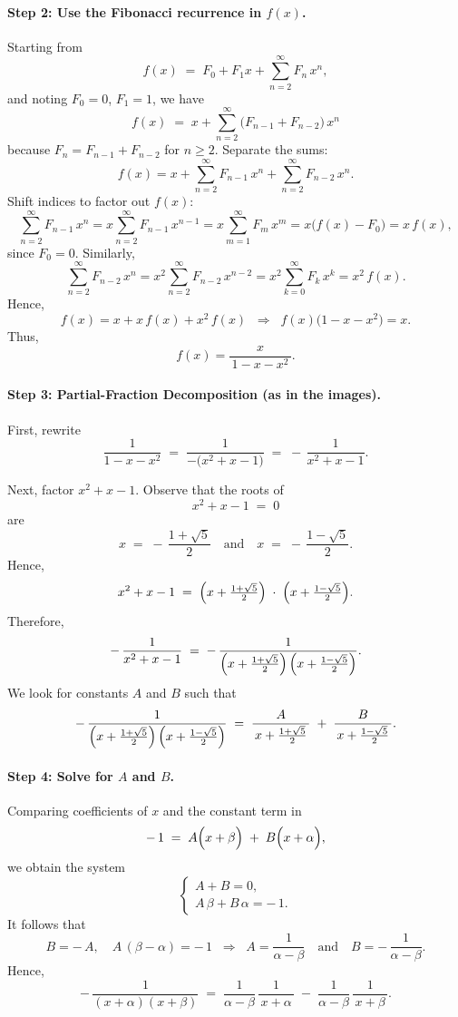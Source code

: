 \documentclass{article}
\begin{document}
\paragraph{Step 2: Use the Fibonacci recurrence in \(f(x)\).}
Starting from
\[
f(x) \;=\; F_0 + F_1 x + \sum_{n=2}^{\infty} F_n\,x^n,
\]
and noting \(F_0=0\), \(F_1=1\), we have
\[
f(x) \;=\; x + \sum_{n=2}^{\infty} \bigl(F_{n-1} + F_{n-2}\bigr)\,x^n
\]
because \(F_n = F_{n-1} + F_{n-2}\) for \(n\ge2\). Separate the sums:
\[
f(x)
= x
+ \sum_{n=2}^{\infty} F_{n-1}\,x^n
+ \sum_{n=2}^{\infty} F_{n-2}\,x^n.
\]
Shift indices to factor out \(f(x)\):
\[
\sum_{n=2}^{\infty} F_{n-1}\,x^n 
= x \sum_{n=2}^{\infty} F_{n-1}\,x^{n-1} 
= x \sum_{m=1}^{\infty} F_m\,x^m 
= x \bigl(f(x) - F_0\bigr) 
= x\,f(x),
\]
since \(F_0=0\). Similarly,
\[
\sum_{n=2}^{\infty} F_{n-2}\,x^n 
= x^2 \sum_{n=2}^{\infty} F_{n-2}\,x^{n-2}
= x^2 \sum_{k=0}^{\infty} F_k\,x^k
= x^2\,f(x).
\]
Hence,
\[
f(x) = x + x\,f(x) + x^2\,f(x) 
\;\;\Longrightarrow\;\;
f(x)\bigl(1 - x - x^2\bigr) = x.
\]
Thus,
\[
f(x) = \frac{x}{\,1 - x - x^2\,}.
\]

\paragraph{Step 3: Partial-Fraction Decomposition (as in the images).}

First, rewrite
\[
\frac{1}{1 - x - x^2}
\;=\;
\frac{1}{-\bigl(x^2 + x - 1\bigr)}
\;=\;
-\,\frac{1}{x^2 + x - 1}.
\]

\noindent
Next, factor \(x^2 + x - 1\). Observe that the roots of
\[
x^2 + x - 1 \;=\; 0
\]
are
\[
x \;=\; -\,\frac{1 + \sqrt{5}}{2}
\quad\text{and}\quad
x \;=\; -\,\frac{1 - \sqrt{5}}{2}.
\]
Hence,
\[
x^2 + x - 1
\;=\;
\Bigl(x + \tfrac{1 + \sqrt{5}}{2}\Bigr)
\;\cdot\;
\Bigl(x + \tfrac{1 - \sqrt{5}}{2}\Bigr).
\]
Therefore,
\[
-\,\frac{1}{x^2 + x - 1}
\;=\;
-\,\frac{1}{\Bigl(x + \tfrac{1 + \sqrt{5}}{2}\Bigr)\,\Bigl(x + \tfrac{1 - \sqrt{5}}{2}\Bigr)}.
\]
We look for constants \(A\) and \(B\) such that
\[
-\,\frac{1}{\Bigl(x + \tfrac{1 + \sqrt{5}}{2}\Bigr)\,\Bigl(x + \tfrac{1 - \sqrt{5}}{2}\Bigr)}
\;=\;
\frac{A}{\,x + \tfrac{1 + \sqrt{5}}{2}\,}
\;+\;
\frac{B}{\,x + \tfrac{1 - \sqrt{5}}{2}\,}.
\]


\paragraph{Step 4: Solve for \(A\) and \(B\).}

Comparing coefficients of \(x\) and the constant term in
\[
-\,1
\;=\;
A\Bigl(x + \beta\Bigr)
\;+\;
B\Bigl(x + \alpha\Bigr),
\]
we obtain the system
\[
\begin{cases}
A + B = 0, \\[4pt]
A\,\beta + B\,\alpha = -\,1.
\end{cases}
\]
It follows that
\[
B = -\,A,
\quad
A\,(\beta - \alpha) = -\,1
\;\;\Longrightarrow\;\;
A = \frac{1}{\alpha - \beta}
\quad\text{and}\quad
B = -\,\frac{1}{\alpha - \beta}.
\]
Hence,
\[
-\,\frac{1}{(x+\alpha)(x+\beta)}
\;=\;
\frac{1}{\alpha - \beta}\,\frac{1}{\,x+\alpha\,}
\;-\;
\frac{1}{\alpha - \beta}\,\frac{1}{\,x+\beta\,}.
\]
\end{document}
